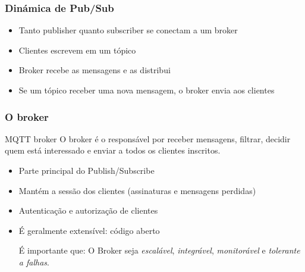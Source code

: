 \documentclass{beamer}
\begin{document}
\begin{frame}
\frametitle{Din\'{a}mica de Pub/Sub}




	\begin{itemize}
	\item Tanto publisher quanto subscriber se conectam a um broker
    \item Clientes escrevem em um t\'{o}pico
    \item Broker recebe as mensagens e as distribui
    \item Se um t\'{o}pico receber uma nova mensagem, o broker envia aos clientes
    
	\end{itemize}
    



\end{frame}

\begin{frame}
\frametitle{O broker}

\begin{block}{MQTT broker}   
    O broker é o responsável por receber mensagens, filtrar, decidir quem está interessado e enviar a todos os clientes inscritos.
\end{block}

\begin{itemize}

\item Parte principal do Publish/Subscribe
\item Mant\'{e}m a sessão dos clientes (assinaturas e mensagens perdidas)
\item Autentica\c{c}\~ao e autoriza\c{c}\~ao de clientes
\item \'{E} geralmente extens\'{i}vel: c\'{o}digo aberto

\begin{block}{\'{E} importante que:}      
	O Broker seja \emph{escalável}, \emph{integr\'{a}vel}, \emph{monitor\'{a}vel} e \emph{tolerante a falhas}.
\end{block}    

\end{itemize}
\end{frame}
\end{document}
